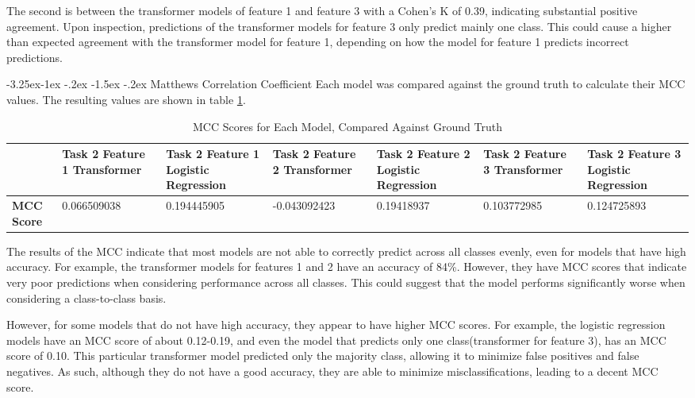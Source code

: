 \documentclass[10.7pt, onecolumn]{article}
\makeatletter
\renewcommand\subsubsection{\@startsection{subsubsection}{3}{\z@}%
	{-3.25ex\@plus -1ex \@minus -.2ex}%
    {-1.5ex \@plus -.2ex}%
    {\normalfont\itshape}}
\makeatother
\begin{document}
The second is between the transformer models of feature 1 and feature 3 with a Cohen's K of 0.39, indicating substantial positive agreement. Upon inspection, predictions of the transformer models for feature 3 only predict mainly one class. This could cause a higher than expected agreement with the transformer model for feature 1, depending on how the model for feature 1 predicts incorrect predictions.

\subsubsection{Matthews Correlation Coefficient}
Each model was compared against the ground truth to calculate their MCC values. The resulting values are shown in table \ref{tab:mccTab}.

\begin{table}[h!]
  \centering
  \begin{tabular}{|p{1cm}|p{2cm}|p{2cm}|p{2cm}|p{2cm}|p{2cm}|p{2cm}|}
      \hline
      & \textbf{Task 2 Feature 1 Transformer} & \textbf{Task 2 Feature 1 Logistic Regression} & \textbf{Task 2 Feature 2 Transformer} & \textbf{Task 2 Feature 2 Logistic Regression} & \textbf{Task 2 Feature 3 Transformer} & \textbf{Task 2 Feature 3 Logistic Regression} \\
      \hline
      \textbf{MCC Score} & 0.066509038 & 0.194445905 & -0.043092423 & 0.19418937 & 0.103772985 & 0.124725893 \\
      \hline
  \end{tabular}
  \caption{MCC Scores for Each Model, Compared Against Ground Truth}
  \label{tab:mccTab}
\end{table}

The results of the MCC indicate that most models are not able to correctly predict across all classes evenly, even for models that have high accuracy. For example, the transformer models for features 1 and 2 have an accuracy of 84\%. However, they have MCC scores that indicate very poor predictions when considering performance across all classes. This could suggest that the model performs significantly worse when considering a class-to-class basis.

However, for some models that do not have high accuracy, they appear to have higher MCC scores. For example, the logistic regression models have an MCC score of about 0.12-0.19, and even the model that predicts only one class(transformer for feature 3), has an MCC score of 0.10. This particular transformer model predicted only the majority class, allowing it to minimize false positives and false negatives. As such, although they do not have a good accuracy, they are able to minimize misclassifications, leading to a decent MCC score.
\end{document}
